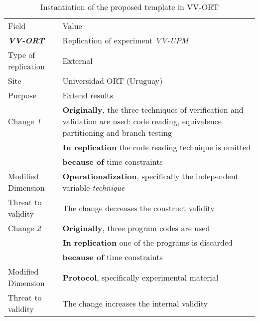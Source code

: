 
\begin{table}[h]
  \caption{Instantiation of the proposed template in VV-ORT}
\label{tab:plantEng}
  \centering
	\scriptsize

\begin{tabularx}{\textwidth}{
  >{\hsize=0.55\hsize}X
  >{\hsize=1.45\hsize}X}
  
    \noalign{\smallskip}\hline\noalign{\smallskip}
  
  Field &  Value  \\ 
  \noalign{\smallskip}\hline\noalign{\smallskip}
  
 \textbf {\textit{VV-ORT}} & 
 Replication of experiment \textit{VV-UPM} \\ 
  
    Type of replication &  External \\  
    Site & Universidad ORT (Uruguay) \\  

    Purpose  &  Extend results \\  \hline
    Change \textit{1}   & \textbf{Originally}, the three techniques of verification and validation are used: code reading, equivalence partitioning and branch testing \\& \textbf{In replication} the code reading technique is omitted \\& \textbf{because of} time constraints \\
    
    Modified Dimension & 
    \textbf{Operationalization}, specifically the independent variable  \textit {technique} \\   
    Threat to validity & The change decreases the construct validity  \\  \hline
  
    Change \textit{2}   & \textbf{Originally}, three program codes are used \\& \textbf{In replication} one of the programs is  discarded \\& \textbf{because of} time constraints \\  

    Modified Dimension & 
    \textbf{Protocol}, specifically experimental
    material \\   
    Threat to validity  & The change increases the internal validity \\  \hline
 

\end{tabularx}
\end{table}
